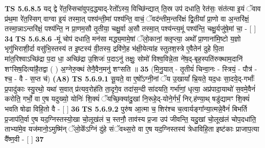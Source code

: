 \documentclass[17pt]{extarticle}
\begin{document}
                  \newline
                                \textbf{ TS 5.6.8.5} \newline
                  यद् द्वे रे॑त॒स्सिचा॑वुपद॒द्ध्याद्-रेतो᳚ऽस्य॒ विच्छि॑न्द्यात् ति॒स्र उप॑ दधाति॒ रेत॑सः॒ संत॑त्या इ॒यं ॅवाव प्र॑थ॒मा रे॑त॒स्सिग् वाग्वा इ॒यं तस्मा॒त् पश्य॑न्ती॒मां पश्य॑न्ति॒ वाचं॒ ॅवद॑न्तीम॒न्तरि॑क्षं द्वि॒तीया᳚ प्रा॒णो वा अ॒न्तरि॑क्षं॒ तस्मा॒न्नाऽन्तरि॑क्षं॒ पश्य॑न्ति॒ न प्रा॒णम॒सौ तृ॒तीया॒ चक्षु॒र्वा अ॒सौ तस्मा॒त् पश्य॑न्त्य॒मूं पश्य॑न्ति॒ चक्षु॒र्यजु॑षे॒मां चा॒ - [  ] \textbf{  34} \newline
                  \newline
                                \textbf{ TS 5.6.8.6} \newline
                  -मूं चोप॑ दधाति॒ मन॑सा मद्ध्य॒मामे॒षां ॅलो॒कानां॒ क्लृप्त्या॒ अथो᳚ प्रा॒णाना॑मि॒ष्टो य॒ज्ञो भृगु॑भिराशी॒र्दा वसु॑भि॒स्तस्य॑ त इ॒ष्टस्य॑ वी॒तस्य॒ द्रवि॑णे॒ह भ॑क्षी॒येत्या॑ह स्तुतश॒स्त्रे ए॒वैतेन॑ दुहे पि॒ता मा॑त॒रिश्वाऽच्छि॑द्रा प॒दा धा॒ अच्छि॑द्रा उ॒शिजः॑ प॒दाऽनु॑ तक्षुः॒ सोमो॑ विश्व॒विन्ने॒ता ने॑ष॒द्-बृह॒स्पति॑रुक्थाम॒दानि॑ शꣳसिष॒दित्या॑है॒तद्वा ( ) अ॒ग्नेरु॒क्थं तेनै॒वैन॒मनु॑ शꣳसति ॥ \textbf{  35 } \newline
                  \newline
                      (मि॒नु॒यात् - तृ॒तीयं॑ चिन्वा॒नः - स्त्रियं॒ - पौत्र॑ - श्च॒ - वै - स॒प्त च॑)  \textbf{(A8)} \newline \newline
                                        \textbf{ TS 5.6.9.1} \newline
                  सू॒यते॒ वा ए॒षो᳚ऽग्नी॒नां ॅय उ॒खायां᳚ भ्रि॒यते॒ यद॒धः सा॒दये॒द्-गर्भाः᳚ प्र॒पादु॑काः स्यु॒रथो॒ यथा॑ स॒वात् प्र॑त्यव॒रोह॑ति ता॒दृगे॒व तदा॑स॒न्दी सा॑दयति॒ गर्भा॑णां॒ धृत्या॒ अप्र॑पादा॒याथो॑ स॒वमे॒वैनं॑ करोति॒ गर्भो॒ वा ए॒ष यदुख्यो॒ योनिः॑ शि॒क्यं॑ ॅयच्छि॒क्या॑दु॒खां नि॒रूहे॒द्-योने॒र्गर्भं॒ निर्.ह॑ण्या॒थ् षडु॑द्यामꣳ शि॒क्यं॑ भवति षोढा विहि॒तो वै - [  ] \textbf{  36} \newline
                  \newline
                                \textbf{ TS 5.6.9.2} \newline
                  पुरु॑ष आ॒त्मा च॒ शिर॑श्च च॒त्वार्यङ्गा᳚न्या॒त्मन्ने॒वैनं॑ बिभर्ति प्र॒जाप॑ति॒र्वा ए॒ष यद॒ग्निस्तस्यो॒खा चो॒लूख॑लं च॒ स्तनौ॒ ताव॑स्य प्र॒जा उप॑ जीवन्ति॒ यदु॒खां चो॒लूख॑लं चोप॒दधा॑ति॒ ताभ्या॑मे॒व यज॑मानो॒ऽमुष्मि॑न् ॅलो॒के᳚ऽग्निं दु॑हे संॅवथ्स॒रो वा ए॒ष यद॒ग्निस्तस्य॑ त्रेधाविहि॒ता इष्ट॑काः प्राजाप॒त्या वै᳚ष्ण॒वी - [  ] \textbf{  37} \newline
\end{document}
